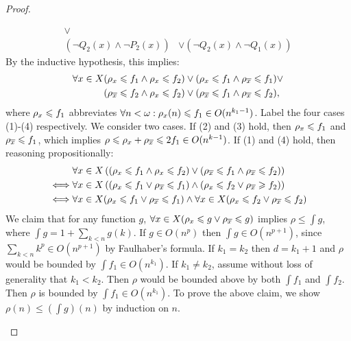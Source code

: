 \begin{proof}
\begin{outline}
\begin{align*}
            \lor \\
            (\lnot Q_2(x)\land\lnot P_2(x))
            & \lor 
            (\lnot Q_2(x)\land\lnot Q_1(x))
        \end{align*}
        \2 By the inductive hypothesis, this implies:
        \begin{align*}
            \forall x\in X
            (\rho_x\leqslant f_1 \land \rho_x\leqslant f_2) 
            &\lor
            (\rho_x\leqslant f_1 \land \rho_{\overline{x}}\leqslant f_1)
            \lor \\
            (\rho_{\overline{x}}\leqslant f_2 \land \rho_x\leqslant f_2)
            &\lor
            (\rho_{\overline{x}}\leqslant f_1 \land \rho_{\overline{x}}\leqslant f_2),
        \end{align*}
        where $\rho_x\leqslant f_1$ abbreviates $\forall n<\omega: \rho_x(n)\leqslant f_1\in O(n^{k_1-1})$. Label the four cases (1)-(4) respectively.
        \2 We consider two cases. 
            \3 If (2) and (3) hold, then $\rho_x \leqslant f_1$ and $\rho_{\overline{x}} \leqslant f_1$, which implies $\rho \leqslant \rho_x + \rho_{\overline{x}} \leqslant 2f_1 \in O(n^{k-1})$.
            \3 If (1) and (4) hold, then reasoning propositionally:
            \begin{align*}
            & \forall x\in X \left((\rho_x\leqslant f_1 \land \rho_x\leqslant f_2) 
            \lor
            (\rho_{\overline{x}}\leqslant f_1 \land \rho_{\overline{x}}\leqslant f_2)\right) \\
            \iff & \forall x\in X \left( (\rho_x \leqslant f_1 \lor \rho_{\overline{x}}\leqslant f_1)\land (\rho_x \leqslant f_2 \lor \rho_{\overline{x}}\geqslant f_2) \right) \\
            \iff & \forall x\in X (\rho_x \leqslant f_1 \lor \rho_{\overline{x}}\leqslant f_1) \land \forall x\in X (\rho_x \leqslant f_2 \lor \rho_{\overline{x}}\leqslant f_2)
            \end{align*}
        \2 We claim that for any function $g$, $\forall x\in X (\rho_x \leqslant g \lor \rho_{\overline{x}}\leqslant g)$ implies $\rho \leq \int g$, where $\int g = 1 + \sum_{k<n}g(k)$. 
            \3 If $g\in O(n^p)$ then $\int g \in O(n^{p+1})$, since $\sum_{k<n}k^p \in O(n^{p+1})$ by Faulhaber's formula.
            \3 If $k_1 = k_2$ then $d=k_1+1$ and $\rho$ would be bounded by $\int f_1 \in O(n^{k_1})$.
            \3 If $k_1 \neq k_2$, assume without loss of generality that $k_1 < k_2$. Then $\rho$ would be bounded above by both $\int f_1$ and $\int f_2$. Then $\rho$ is bounded by $\int f_1 \in O(n^{k_1})$.
        \2 To prove the above claim, we show $\rho(n)\leq (\int g)(n)$ by induction on $n$. 

\end{outline}
\end{proof}
